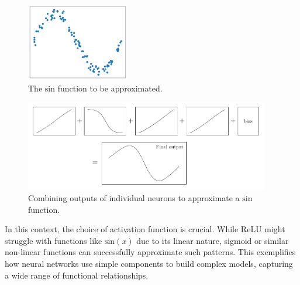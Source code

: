 \documentclass[twoside,11pt]{report}
\begin{document}
\begin{figure}
    \begin{center}
        \includegraphics[width=0.4\textwidth]{../runsAndFigures/sin.png}
    \end{center}
    \caption{The $\text{sin}$ function to be approximated.}\label{fig:sin}
\end{figure}

\begin{figure}
    \begin{center}
        \includegraphics[width=0.95\textwidth]{tikzfigures/universal.pdf}
    \end{center}
    \caption{Combining outputs of individual neurons to approximate a $\text{sin}$ function.}\label{fig:universal}
\end{figure}

In this context, the choice of activation function is crucial. While ReLU might struggle with functions like $\text{sin}(x)$ due to its linear nature, sigmoid or similar non-linear functions can successfully approximate such patterns. This exemplifies how neural networks use simple components to build complex models, capturing a wide range of functional relationships.



\vskip 0.2in

% 

\end{document}

